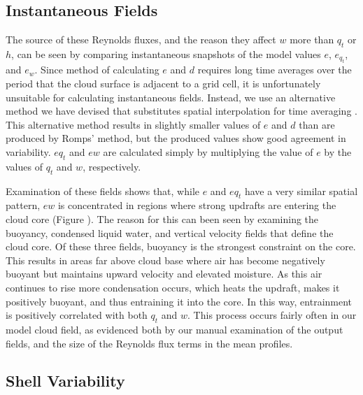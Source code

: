 \documentclass[draft,grl]{agutex}
\begin{document}
\begin{article}
\subsection{Instantaneous Fields}

The source of these Reynolds fluxes, and the reason they affect $w$ more than 
$q_t$ or $h$, can be seen by comparing instantaneous snapshots of the model 
values $e$, $e_{q_t}$, and $e_w$.  Since \cite{Romps2010} method of calculating 
$e$ and $d$ requires long time averages over the period that the cloud surface
is adjacent to a grid cell, it is unfortunately unsuitable for calculating 
instantaneous fields.  Instead, we use an alternative method we have devised 
that substitutes spatial interpolation for time averaging \citep{Dawe2011}.  
This alternative method results in slightly smaller values of $e$ and $d$ than 
are produced by Romps' method, but the produced values show good agreement in 
variability. $eq_t$ and $ew$ are calculated simply by multiplying the value 
of $e$ by the values of $q_t$ and $w$, respectively.

Examination of these fields shows that, while $e$ and $eq_t$ have a very 
similar spatial pattern, $ew$ is concentrated in regions where strong updrafts 
are entering the cloud core (Figure \label{fig:w_entrainment_example}).  The 
reason for this can been seen by examining the buoyancy, condensed liquid water,
and vertical velocity fields that define the cloud core.  Of these three
fields, buoyancy is the strongest constraint on the core.  This results in 
areas far above cloud base where air has become negatively buoyant but 
maintains upward velocity and elevated moisture.  As this air continues to 
rise more condensation occurs, which heats the updraft, makes it positively 
buoyant, and thus entraining it into the core.  In this way, entrainment is 
positively correlated with both $q_t$ and $w$.  This process occurs fairly 
often in our model cloud field, as evidenced both by our manual examination of 
the output fields, and the size of the Reynolds flux terms in the mean 
profiles.


\subsection{Shell Variability}


\end{article}
\end{document}
